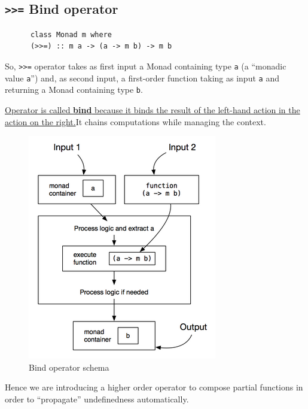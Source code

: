 
\newpage
\subsection{\texttt{>>=} Bind operator}

\begin{paracol}{2}
   \colfill
   \begin{lstlisting}
      class Monad m where
      (>>=) :: m a -> (a -> m b) -> m b
   \end{lstlisting}
   
   So, \lstinline|>>=| operator takes as first input a Monad containing type \lstinline|a| (a ``monadic value \lstinline|a|'') and, as second input, a first-order function taking as input \lstinline|a| and returning a Monad containing type \lstinline|b|.

   \ul{Operator is called \textbf{bind} because it binds the result
   of the left-hand action in the action on the right.}It chains computations while managing the context.
   \colfill

   \switchcolumn
   \begin{figure}[htbp]
      \centering
      \includegraphics{images/monads_bind.png}
      \caption{Bind operator schema}
      \label{fig:monads_bind}
   \end{figure}
\end{paracol}

Hence we are introducing a higher order operator to
compose partial functions in order to
``propagate'' undefinedness automatically.

